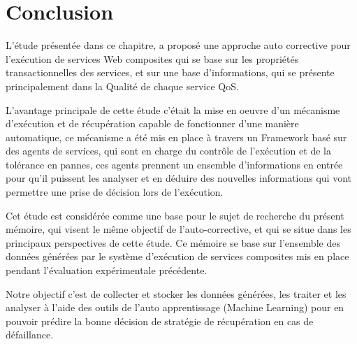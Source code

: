 \section{Conclusion}

L'étude présentée dans ce chapitre, a proposé une approche auto corrective pour l'exécution de services Web composites qui se base sur les propriétés transactionnelles des services, et sur une base d'informations, qui se présente principalement dans la Qualité de chaque service QoS.

L'avantage principale de cette étude c'était la mise en oeuvre d'un mécanisme d'exécution et de récupération capable de fonctionner d'une manière automatique, ce mécanisme a été mis en place à travers un Framework basé sur des agents de services, qui sont en charge du contrôle de l'exécution  et de la tolérance en pannes, ces agents prennent un ensemble d'informations en entrée pour qu'il puissent les analyser et en déduire des nouvelles informations qui vont permettre une prise de décision lors de l'exécution.

Cet étude est considérée comme une base pour le sujet de recherche du présent mémoire, qui visent le même objectif de l'auto-corrective, et qui se situe dans les principaux perspectives de cette étude. Ce mémoire se base sur l'ensemble des données générées par le système d'exécution de services composites mis en place pendant l'évaluation expérimentale précédente.

Notre objectif c'est de collecter et stocker les données générées, les traiter et les analyser à l'aide des outils de l'auto apprentissage (Machine Learning) pour en pouvoir prédire la bonne décision de stratégie de récupération en cas de défaillance.




